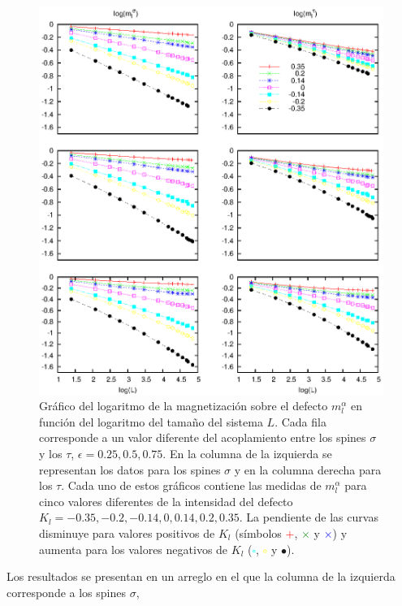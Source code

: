 \begin{figure}[h!]
\begin{center}
\includegraphics[width=\figwidth]{graf/exp/ml_vs_L_all.eps}
\end{center}
\caption{Gráfico del logaritmo de la magnetización sobre el defecto $m_{l}^{\alpha}$ en función del logaritmo del tamaño del
 sistema $L$. Cada fila corresponde a un valor diferente del acoplamiento entre los spines $\sigma$ y los $\tau$,
 $\epsilon=0.25, 0.5, 0.75$. En la columna de la izquierda se representan los datos para los spines $\sigma$ y en
 la columna derecha para los $\tau$. Cada uno de estos gr\'aficos contiene las medidas de $m_{l}^{\alpha}$ para cinco
 valores diferentes de la intensidad del defecto $K_{l}=-0.35, -0.2, -0.14, 0, 0.14, 0.2, 0.35$. La pendiente de las
 curvas disminuye para valores positivos de $K_{l}$ (s\'imbolos \textcolor{red}{$+$}, \textcolor{green}{$\times$}
 y \textcolor{blue}{$\times$}) y aumenta para los valores negativos de $K_{l}$ (\textcolor{cyan}{$\square$}, \textcolor{yellow}{$\circ$}
 y $\bullet$).}
\label{fig:ml_vs_L_all}
\end{figure}
Los resultados se presentan en un arreglo en el que la columna de la izquierda corresponde a los spines $\sigma$,
